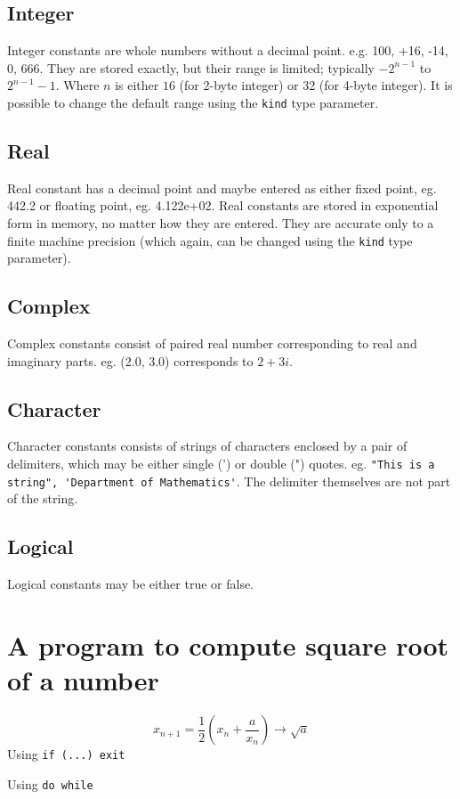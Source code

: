 \documentclass[12pt,oneside]{book}
\newcommand{\code}[1]{\lstinline[keywordstyle=\color{black},basicstyle=\ttfamily]{#1}}
\begin{document}
    \subsection{Integer}
    Integer constants are whole numbers without a decimal point. e.g. 100, +16, -14, 0, 666. They are stored exactly, but their range is limited; typically $ -2^{n-1} $ to $ 2^{n-1}-1 $. Where $ n $ is either $ 16 $ (for 2-byte integer) or 32 (for 4-byte integer). 
    It is possible to change the default range using the \code{kind} type parameter.
    \subsection{Real}
    Real constant has a decimal point and maybe entered as either fixed point, eg. 442.2 or floating point, eg. 4.122e+02.
    Real constants are stored in exponential form in memory, no matter how they are entered. 
    They are accurate only to a finite machine precision (which again, can be changed using the \code{kind} type parameter).
    \subsection{Complex}
    Complex constants consist of paired real number corresponding to real and imaginary parts. eg. (2.0, 3.0) corresponds to $ 2+3i $.
    \subsection{Character}
    Character constants consists of strings of characters enclosed by a pair of delimiters, which may be either single (') or double (") quotes. eg. \code{"This is a string", 'Department of Mathematics'}. The delimiter themselves are not part of the string.
    \subsection{Logical}
    Logical constants may be either true or false.
    \section{A program to compute square root of a number}
    \[x_{n+1}=\frac{1}{2}\left(x_n+\frac{a}{x_n}\right)\to \sqrt{a}\]
    Using \code{if (...) exit}
    
    Using \code{do while}
    
\end{document}
